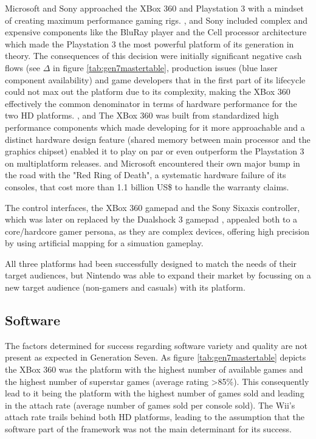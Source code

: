 \documentclass
[
    a4paper,
    11pt
]
{article}
\begin{document}
Microsoft and Sony approached the XBox 360 and Playstation 3 with a mindset of
creating maximum performance gaming rigs. \cite{Spencer2016}, \cite{Crossley2016} and
\cite{Gamesindustry.biz2006} Sony included complex and expensive components
like the BluRay player and the Cell processor architecture which made the Playstation 3
the most powerful platform of its generation in theory. The consequences of this
decision were initially significant negative cash flows (see $\Delta$ in figure \ref{tab:gen7mastertable}, production issues (blue laser component availability) \cite{EETimes2006}
and game developers that in the first part of its lifecycle could not max out the
platform due to its complexity, making the XBox 360 effectively the common denominator in terms of hardware
performance for the two HD platforms. \cite{Nelson2009}, \cite{Karraker2007} and \cite{Reisinger}
The XBox 360 was built from standardized high performance components which made developing for it more
approachable and a distinct hardware design feature (shared memory between main processor and the graphics
chipset) enabled it to play on par or even outperform the Playstation 3 on
multiplatform releases. \cite{Crossley2016} and \cite{Anthony2013} Microsoft
encountered their own major bump in the road with the "Red Ring of Death", a systematic
hardware failure of its consoles, that cost more than 1.1 billion US\$ to handle
the warranty claims. \cite{Takahashi2008}

The control interfaces, the XBox 360 gamepad and the Sony Sixaxis controller,
which was later on replaced by the Dualshock 3 gamepad \cite{Sony2007},
appealed both to a core/hardcore gamer persona, as they are complex devices,
offering high precision by using artificial mapping for a simuation gameplay.

All three platforms had been successfully designed to match the needs of their
target audiences, but Nintendo was able to expand their market by focussing
on a new target audience (non-gamers and casuals) with its platform.

\subsection{Software}
\label{application-software}
The factors determined for success regarding software variety and quality
are not present as expected in Generation Seven. As figure \ref{tab:gen7mastertable}
depicts the XBox 360 was the platform with the highest number of available
games and the highest number of superstar games (average rating \textgreater 85\%).
This consequently lead to it being the platform with the highest number of
games sold and leading in the attach rate (average number of games sold per console sold).
The Wii's attach rate trails behind both HD platforms, leading to the assumption
that the software part of the framework was not the main determinant for its
success.
\end{document}
